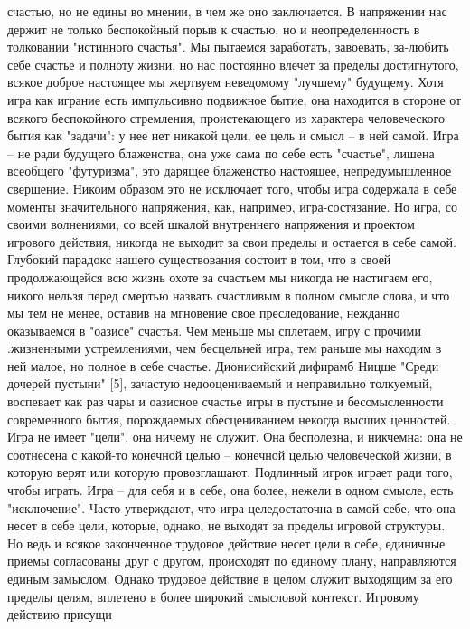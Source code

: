 \documentclass[12pt]{article}
\begin{document}
счастью, но не едины во мнении, в чем же оно заключается. В напряжении нас держит не только беспокойный
порыв к счастью, но и неопределенность в толковании "истинного счастья". Мы пытаемся заработать, завоевать,
за-любить себе счастье и полноту жизни, но нас постоянно влечет за пределы достигнутого, всякое доброе
настоящее мы жертвуем неведомому "лучшему" будущему. Хотя игра как играние есть импульсивно подвижное
бытие,  она  находится  в  стороне  от  всякого  беспокойного  стремления,  проистекающего  из  характера
человеческого бытия как "задачи": у нее нет никакой цели, ее цель и смысл -- в ней самой. Игра -- не ради
будущего  блаженства,  она  уже  сама  по  себе  есть  "счастье",  лишена  всеобщего  "футуризма",  это  дарящее
блаженство настоящее, непредумышленное свершение. Никоим образом это не исключает того, чтобы игра
содержала в себе моменты значительного напряжения, как, например, игра-состязание. Но игра, со своими
волнениями, со всей шкалой внутреннего напряжения и проектом игрового действия, никогда не выходит за
свои пределы и остается в себе самой. Глубокий парадокс нашего существования состоит в том, что в своей
продолжающейся всю жизнь охоте за счастьем мы никогда не настигаем его, никого нельзя перед смертью
назвать счастливым в полном смысле слова, и что мы тем не менее, оставив на мгновение свое преследование,
нежданно  оказываемся  в  "оазисе"  счастья.  Чем  меньше  мы  сплетаем,  игру  с  прочими  .жизненными
устремлениями,  чем  бесцельней  игра,  тем  раньше  мы  находим  в  ней  малое,  но  полное  в  себе  счастье.
Дионисийский  дифирамб  Ницше  "Среди  дочерей  пустыни"  [5],  зачастую  недооцениваемый  и  неправильно
толкуемый, воспевает как раз чары и оазисное счастье игры в пустыне и бессмысленности современного бытия,
порождаемых обесцениванием некогда высших ценностей. Игра не имеет "цели", она ничему не служит. Она
бесполезна, и никчемна: она не соотнесена с какой-то конечной целью -- конечной целью человеческой жизни, в
которую верят или которую провозглашают. Подлинный игрок играет ради того, чтобы играть. Игра -- для себя
и в себе, она более, нежели в одном смысле, есть "исключение". Часто утверждают, что игра целедостаточна в
самой себе, что она несет в себе цели, которые, однако, не выходят за пределы игровой структуры. Но ведь и
всякое  законченное  трудовое  действие  несет  цели  в  себе,  единичные  приемы  согласованы  друг  с  другом,
происходят по единому плану, направляются единым замыслом. Однако трудовое действие в целом служит
выходящим за его пределы целям, вплетено в более широкий смысловой контекст. Игровому действию присущи
\end{document}
